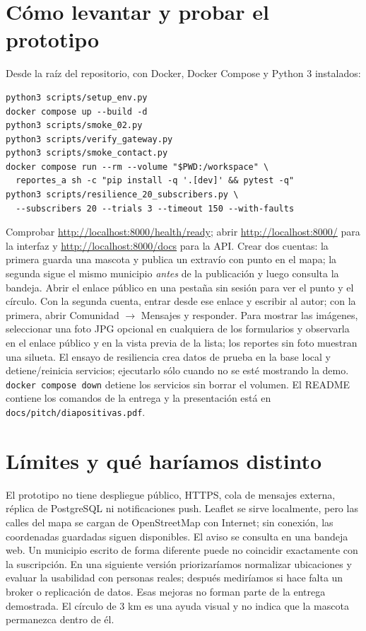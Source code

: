 \documentclass[11pt,letterpaper]{article}
\begin{document}
\section{Cómo levantar y probar el prototipo}
Desde la raíz del repositorio, con Docker, Docker Compose y Python 3 instalados:
\begin{verbatim}
python3 scripts/setup_env.py
docker compose up --build -d
python3 scripts/smoke_02.py
python3 scripts/verify_gateway.py
python3 scripts/smoke_contact.py
docker compose run --rm --volume "$PWD:/workspace" \
  reportes_a sh -c "pip install -q '.[dev]' && pytest -q"
python3 scripts/resilience_20_subscribers.py \
  --subscribers 20 --trials 3 --timeout 150 --with-faults
\end{verbatim}
\Needspace{10\baselineskip}
Comprobar \url{http://localhost:8000/health/ready}; abrir \url{http://localhost:8000/} para la interfaz y \url{http://localhost:8000/docs} para la API. Crear dos cuentas: la primera guarda una mascota y publica un extravío con punto en el mapa; la segunda sigue el mismo municipio \emph{antes} de la publicación y luego consulta la bandeja. Abrir el enlace público en una pestaña sin sesión para ver el punto y el círculo. Con la segunda cuenta, entrar desde ese enlace y escribir al autor; con la primera, abrir Comunidad $\to$ Mensajes y responder. Para mostrar las imágenes, seleccionar una foto JPG opcional en cualquiera de los formularios y observarla en el enlace público y en la vista previa de la lista; los reportes sin foto muestran una silueta. El ensayo de resiliencia crea datos de prueba en la base local y detiene/reinicia servicios; ejecutarlo sólo cuando no se esté mostrando la demo. \texttt{docker compose down} detiene los servicios sin borrar el volumen. El README contiene los comandos de la entrega y la presentación está en \texttt{docs/pitch/diapositivas.pdf}.

\section{Límites y qué haríamos distinto}
El prototipo no tiene despliegue público, HTTPS, cola de mensajes externa, réplica de PostgreSQL ni notificaciones push. Leaflet se sirve localmente, pero las calles del mapa se cargan de OpenStreetMap con Internet; sin conexión, las coordenadas guardadas siguen disponibles. El aviso se consulta en una bandeja web. Un municipio escrito de forma diferente puede no coincidir exactamente con la suscripción. En una siguiente versión priorizaríamos normalizar ubicaciones y evaluar la usabilidad con personas reales; después mediríamos si hace falta un broker o replicación de datos. Esas mejoras no forman parte de la entrega demostrada. El círculo de 3 km es una ayuda visual y no indica que la mascota permanezca dentro de él.
\end{document}
